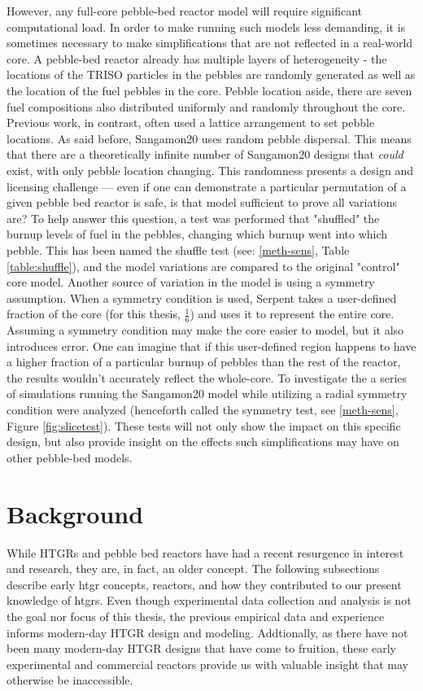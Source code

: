However, any full-core pebble-bed reactor model will require significant computational load.  In order to make running such models less demanding, it is sometimes necessary to make simplifications that are not reflected in a real-world core.  A pebble-bed reactor already has multiple layers of heterogeneity - the locations of the TRISO particles in the pebbles are randomly generated as well as the location of the fuel pebbles in the core.  Pebble location aside, there are seven fuel compositions also distributed uniformly and randomly throughout the core.  Previous work, in contrast, often used a lattice arrangement to set pebble locations. As said before, Sangamon20 uses random pebble dispersal.  This means that there are a theoretically infinite number of Sangamon20 designs that \emph{could} exist, with only pebble location changing.  This randomness presents a design and licensing challenge --- even if one can demonstrate a particular permutation of a given pebble bed reactor is safe, is that model sufficient to prove all variations are?  To help answer this question, a test was performed that "shuffled" the burnup levels of fuel in the pebbles, changing which burnup went into which pebble.  This has been named the shuffle test (see: \autoref{meth-sens}, Table \ref{table:shuffle}), and the model variations are compared to the original "control" core model.  Another source of variation in the model is using a symmetry assumption.  When a symmetry condition is used, Serpent takes a user-defined fraction of the core (for this thesis, $\frac{1}{6}$) and uses it to represent the entire core.  Assuming a symmetry condition may make the core easier to model, but it also introduces error.  One can imagine that if this user-defined region happens to have a higher fraction of a particular burnup of pebbles than the rest of the reactor, the results wouldn't accurately reflect the whole-core.  To investigate the a series of simulations running the Sangamon20 model while utilizing a radial symmetry condition were analyzed (henceforth called the symmetry test, see \autoref{meth-sens}, Figure \ref{fig:slicetest}).  These tests will not only show the impact on this specific design, but also provide insight on the effects such simplifications may have on other pebble-bed models.

\section{Background}
\label{sec:intro-background}

While HTGRs and pebble bed reactors have had a recent resurgence in interest and research, they are, in fact, an older concept.  The following subsections describe early \acrshort{htgr} concepts, reactors, and how they contributed to our present knowledge of \acrshort{htgr}s.  Even though experimental data collection and analysis is not the goal nor focus of this thesis, the previous empirical data and experience informs modern-day HTGR design and modeling.  Addtionally, as there have not been many modern-day HTGR designs that have come to fruition, these early experimental and commercial reactors provide us with valuable insight that may otherwise be inaccessible.

